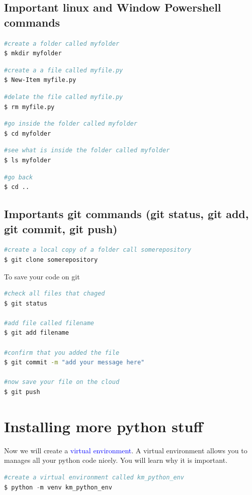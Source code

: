 \documentclass[10pt,a4paper,titlepage]{article}
\begin{document}
\subsection{Important linux and Window Powershell commands}
\begin{lstlisting}[language=bash]
#create a folder called myfolder
$ mkdir myfolder
\end{lstlisting}

\begin{lstlisting}[language=bash]
#create a a file called myfile.py
$ New-Item myfile.py
\end{lstlisting}

\begin{lstlisting}[language=bash]
#delate the file called myfile.py
$ rm myfile.py
\end{lstlisting}


\begin{lstlisting}[language=bash]
#go inside the folder called myfolder
$ cd myfolder
\end{lstlisting}

\begin{lstlisting}[language=bash]
#see what is inside the folder called myfolder
$ ls myfolder
\end{lstlisting}

\begin{lstlisting}[language=bash]
#go back
$ cd .. 
\end{lstlisting}

\subsection{Importants git commands (git status, git add, git commit, git push)}
\begin{lstlisting}[language=bash]
#create a local copy of a folder call somerepository
$ git clone somerepository
\end{lstlisting}
\justify
To save your code on git
\begin{lstlisting}[language=bash]
#check all files that chaged
$ git status

#add file called filename
$ git add filename

#confirm that you added the file 
$ git commit -m "add your message here"

#now save your file on the cloud
$ git push 
\end{lstlisting}


\section{Installing more python stuff}
Now we will create a \textcolor{blue}{virtual environment}. A virtual environment allows you to manages all your python code nicely. You will learn why it is important.
\begin{lstlisting}[language=python]
#create a virtual environment called km_python_env
$ python -m venv km_python_env
\end{lstlisting}
\end{document}
